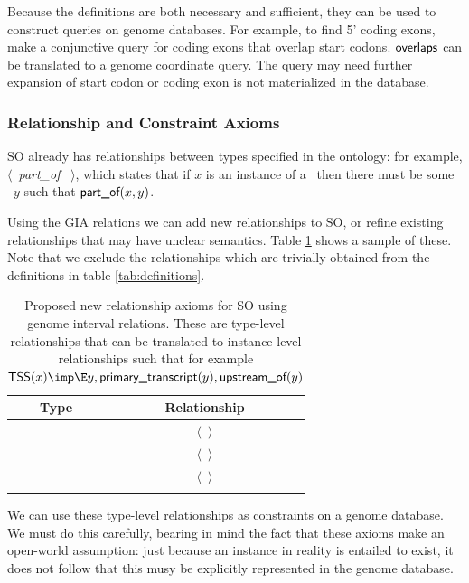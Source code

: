 \documentclass{article}
\newcommand{\tr}[1]{\textit{#1} }
\newcommand{\rel}[1]{$\langle$#1$\rangle$}
\def\omegaOf{\pr{end\_of}}
\def\upstreamOf{\pr{upstream\_of}}
\def\downstreamAdjacentTo{\pr{downstream\_adjacent\_to}}
\def\overlaps{\pr{overlaps}}
\def\partOf{\pr{part\_of}}
\def\partOfT{\tr{part\_of}}
\def\mRNA{\pr{mRNA}}
\def\genome{\pr{genome}}
\def\primaryTranscript{\pr{primary\_transcript}}
\def\transcript{\pr{transcript}}
\def\TSS{\pr{TSS}}
\def\polyAsequence{\pr{polyA\_sequence}}
\def\polyAsite{\pr{polyA\_site}}
\begin{document}

Because the definitions are both necessary and sufficient, they can be
used to construct queries on genome databases. For example, to find 5'
coding exons, make a conjunctive query for coding exons that overlap
start codons. $\overlaps $ can be translated to a genome coordinate
query. The query may need further expansion of start codon or coding
exon is not materialized in the database.

\subsubsection{Relationship and Constraint Axioms}

SO already has relationships between types specified in the ontology:
for example, \rel{\TSS\ \partOfT\ \transcript}, which states that if
$x$ is an instance of a \TSS\ then there must be some \transcript\ $y$
such that $\partOf(x,y)$.

Using the GIA relations we can add new relationships to SO, or refine
existing relationships that may have unclear semantics. Table
\ref{tab:constraints} shows a sample of these. Note that we exclude
the relationships which are trivially obtained from the definitions in
table \ref{tab:definitions}.

\begin{longtable}{ | c | c | }
\hline
Type  & Relationship \\
\hline
\TSS  & \rel{\upstreamOf\ \primaryTranscript}  \\
\hline
\polyAsequence  & \rel{\downstreamAdjacentTo\ \mRNA} \\
\hline
\polyAsite  & \rel{\omegaOf\ \mRNA} \\
\hline
\caption{Proposed new relationship axioms for SO using genome interval
  relations. These are type-level relationships that can be translated
  to instance level relationships such that for example $\TSS(x) \imp
  \E y, \primaryTranscript(y), \upstreamOf(y)$}
\label{tab:constraints}
\end{longtable}


We can use these type-level relationships as constraints on a genome
database. We must do this carefully, bearing in mind the fact that
these axioms make an open-world assumption: just because an instance
in reality is entailed to exist, it does not follow that this musy be
explicitly represented in the genome database.
\end{document}
